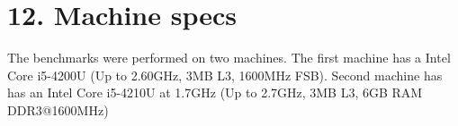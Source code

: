 \section*{12. Machine specs}
The benchmarks were performed on two machines. The first machine has a Intel Core i5-4200U (Up to 2.60GHz, 3MB L3, 1600MHz FSB). Second machine has has an Intel Core i5-4210U at 1.7GHz (Up to 2.7GHz, 3MB L3, 6GB RAM DDR3@1600MHz)
